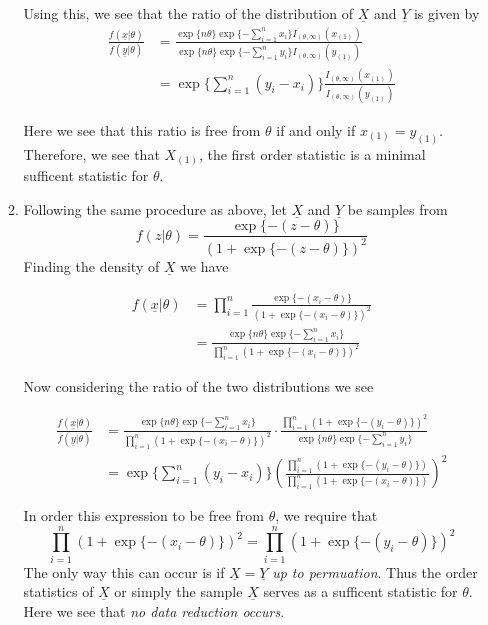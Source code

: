 \documentclass[12pt]{article}  %
\begin{document}
\begin{enumerate}
\begin{enumerate}
Using this, we see that the ratio of the distribution of $\underline{X}$ and $\underline{Y}$ is given by 
\begin{align*}
\frac{f(\underline{x}|\theta)}{f(\underline{y}|\theta)} &= \frac{\exp\{n\theta\}\exp\{-\sum_{i=1}^{n}x_i\}I_{(\theta,\infty)}(x_{(1)})}{\exp\{n\theta\}\exp\{-\sum_{i=1}^{n}y_i\}I_{(\theta,\infty)}(y_{(1)})}\\
&=\exp\{\sum_{i=1}^{n}(y_i - x_i)\}\frac{I_{(\theta,\infty)}(x_{(1)})}{I_{(\theta,\infty)}(y_{(1)})}
\end{align*}

Here we see that this ratio is free from $\theta$ if and only if $x_{(1)} = y_{(1)}$. Therefore, we see that $X_{(1)}$, the first order statistic is a minimal sufficent statistic for $\theta$. 
\item Following the same procedure as above, let $\underline{X}$ and $\underline{Y}$ be samples from $$f(z|\theta) = \frac{\exp\{-(z-\theta)\}}{(1 + \exp\{-(z-\theta)\})^2}$$ Finding the density of $\underline{X}$ we have 

\begin{align*}
f(\underline{x}|\theta) &= \prod_{i=1}^{n}\frac{\exp\{-(x_i-\theta)\}}{(1 + \exp\{-(x_i-\theta)\})^2}\\
&= \frac{\exp\{n\theta\}\exp\{-\sum_{i=1}^{n}x_i\}}{\prod_{i=1}^n (1 + \exp\{-(x_i-\theta)\})^2}
\end{align*}

Now considering the ratio of the two distributions we see 

\begin{align*}
\frac{f(\underline{x}|\theta)}{f(\underline{y}|\theta)} &= \frac{\exp\{n\theta\}\exp\{-\sum_{i=1}^{n}x_i\}}{\prod_{i=1}^n (1 + \exp\{-(x_i-\theta)\})^2} \cdot \frac{\prod_{i=1}^n (1 + \exp\{-(y_i-\theta)\})^2}{\exp\{n\theta\}\exp\{-\sum_{i=1}^{n}y_i\}}\\
&= \exp\{\sum_{i=1}^{n}(y_i - x_i)\}\left(\frac{\prod_{i=1}^n (1 + \exp\{-(y_i-\theta)\})}{\prod_{i=1}^n (1 + \exp\{-(x_i-\theta)\})}\right)^2
\end{align*}

In order this expression to be free from $\theta$, we require that $$\prod_{i=1}^n (1 + \exp\{-(x_i-\theta)\})^2 = \prod_{i=1}^n (1 + \exp\{-(y_i-\theta)\})^2$$ The only way this can occur is if $\underline{X} = \underline{Y}$ \textit{up to permuation}. Thus the order statistics of $\underline{X}$ or simply the sample $\underline{X}$ serves as a sufficent statistic for $\theta$. Here we see that \textit{no data reduction occurs}. 


\end{enumerate}
\end{enumerate}
\end{document}
